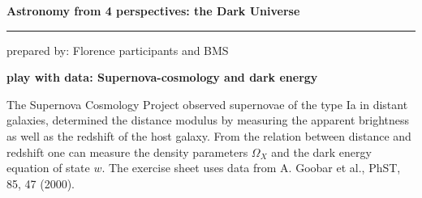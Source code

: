 \documentclass[a4paper,12pt]{article}
\newcommand{\HRule}{\rule{\linewidth}{0.3mm}}
\begin{document}
\pagestyle{empty}

\begin{center}
\LARGE \textbf{Astronomy from 4 perspectives: the Dark Universe}
\HRule
\end{center}
\begin{flushright}
prepared by: Florence participants and BMS
\end{flushright}
\begin{center}
{\Large \textbf{play with data: Supernova-cosmology and dark energy}}
\end{center}
\vspace{5mm}

\noindent
The Supernova Cosmology Project observed supernovae of the type Ia in distant galaxies, determined the distance modulus by measuring the apparent brightness as well as the redshift of the host galaxy. From the relation between distance and redshift one can measure the density parameters $\Omega_X$ and the dark energy equation of state $w$. The exercise sheet uses data from A. Goobar et al., PhST, 85, 47 (2000).
\end{document}
